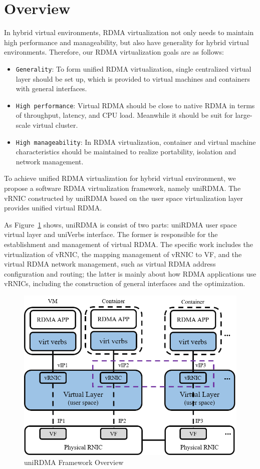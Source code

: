 \section{Overview}

In hybrid virtual environments, RDMA virtualization not only needs to maintain high performance and manageability, but also have generality for hybrid virtual environments. Therefore, our RDMA virtualization goals are as follows:

\begin{itemize}
	\item {\verb|Generality|}: To form unified RDMA virtualization, single centralized virtual layer should be set up, which is provided to virtual machines and containers with general interfaces.
	\item {\verb|High performance|}: Virtual RDMA should be close to native RDMA in terms of throughput, latency, and CPU load. Meanwhile it should be suit for large-scale virtual cluster.
	\item {\verb|High manageability|}: In RDMA virtualization, container and virtual machine characteristics should be maintained to realize portability, isolation and network management.
\end{itemize}

To achieve unified RDMA virtualization for hybrid virtual environment,  we propose a software RDMA virtualization framework, namely uniRDMA. The vRNIC constructed by uniRDMA based on the user space virtualization layer provides unified virtual RDMA.

As Figure~\ref{fig:framework-overview} shows, uniRDMA is consist of two parts: uniRDMA user space virtual layer and uniVerbs interface. The former is responsible for the establishment and management of virtual RDMA. The specific work includes the virtualization of vRNIC, the mapping management of vRNIC to VF, and the virtual RDMA network management, such as virtual RDMA address configuration and routing; the latter is mainly about how RDMA applications use vRNICs, including the construction of general interfaces and the optimization.

\begin{figure}[!ht]
	\centering
	\includegraphics[width=0.9\linewidth]{images/framework-overview}
	\caption{uniRDMA Framework Overview}
	\label{fig:framework-overview}
\end{figure}
